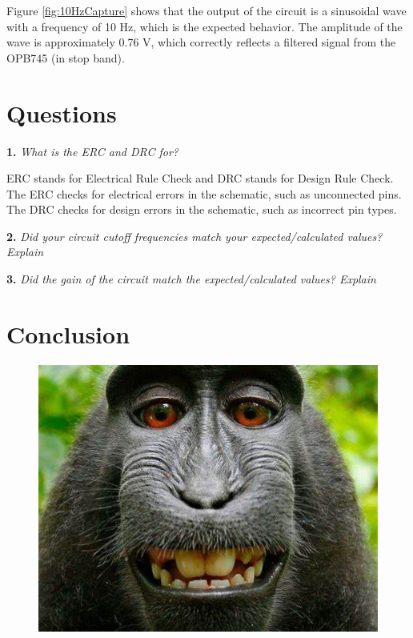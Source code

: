 \documentclass[CMPE]{KGCOEReport}
\begin{document}
Figure \ref{fig:10HzCapture} shows that the output of the circuit is a sinusoidal wave with a frequency of 10 Hz, which is the expected behavior. The amplitude of the wave is approximately 0.76 V, which correctly reflects a filtered signal from the OPB745 (in stop band).

\section*{Questions}

\textbf{1.} \emph{What is the ERC and DRC for?}

ERC stands for Electrical Rule Check and DRC stands for Design Rule Check. The ERC checks for electrical errors in the schematic, such as unconnected pins. The DRC checks for design errors in the schematic, such as incorrect pin types.

\bigskip

\textbf{2.} \emph{Did your circuit cutoff frequencies match your expected/calculated values? Explain}

\bigskip

\textbf{3.} \emph{Did the gain of the circuit match the expected/calculated values? Explain}

\section*{Conclusion}

\newpage
\begin{figure}[H]
    \centering
    \begin{adjustbox}{center}
        \includegraphics[width=1.26\textwidth]{signoff.pdf}
    \end{adjustbox}
\end{figure}
\end{document}
